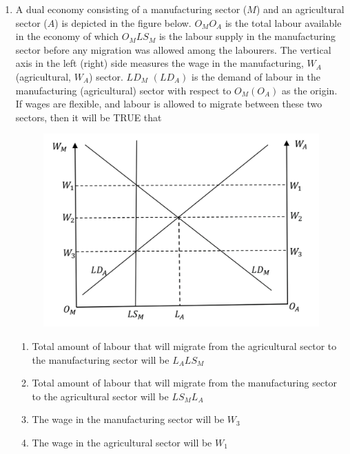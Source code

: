 \documentclass{article}
\begin{document}
\begin{enumerate}[leftmargin=*, start=45, label=Q.\arabic*.]
    \begin{multicols}{2}
    \begin{enumerate}
        \item 6 apricots and 9 bananas
        \item 9 apricots and 9 bananas
        \item 4 apricots and 10 bananas
        \item 0 apricots and 12 bananas
    \end{enumerate}
    \end{multicols}

    \item A dual economy consisting of a manufacturing sector ($M$) and an agricultural sector ($A$) is depicted in the figure below. $O_MO_A$ is the total labour available in the economy of which $O_MLS_M$ is the labour supply in the manufacturing sector before any migration was allowed among the labourers. The vertical axis in the left (right) side measures the wage in the manufacturing, $W_A$ (agricultural, $W_A$) sector. $LD_M$ $(LD_A)$ is the demand of labour in the manufacturing (agricultural) sector with respect to $O_M(O_A)$ as the origin. If wages are flexible, and labour is allowed to migrate between these two sectors, then it will be TRUE that

    \begin{figure}[h]
        \centering
        \includegraphics[width=0.4\linewidth]{Figures/asg1 fig3.png}
        \caption{}
    \end{figure}

    \begin{enumerate}
        \item Total amount of labour that will migrate from the agricultural sector to the manufacturing sector will be $L_ALS_M$
        \item Total amount of labour that will migrate from the manufacturing sector to the agricultural sector will be $LS_ML_A$
        \item The wage in the manufacturing sector will be $W_3$
        \item The wage in the agricultural sector will be $W_1$
    \end{enumerate}


\end{enumerate}
\end{document}
